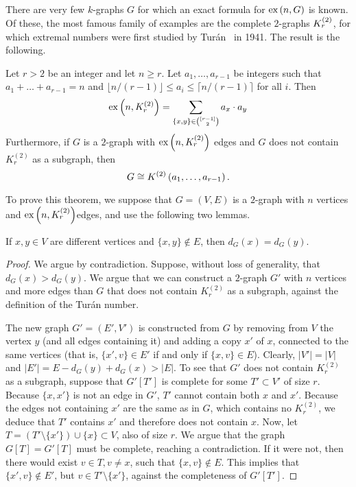 There are very few $k$-graphs $G$ for which an exact formula for $\text{ex} \left( n, G \right)$ is known.
Of these, the most famous family of examples are the complete $2$-graphs $K^{(2)}_{r}$,
for which extremal numbers were first studied by Turán~\cite{Turan1941} in 1941.
The result is the following.

\begin{theorem}
    \label{thm:turan}
    Let $r > 2$ be an integer and let $n \geq r$.
    Let $a_1, \dots, a_{r-1}$ be integers such that $a_1 + \dots + a_{r-1} = n$
    and $\lfloor n / (r-1) \rfloor \leq a_i \leq \lceil n / (r-1) \rceil$ for all $i$.
    Then
    \begin{equation} \label{eq:turan}
        \text{ex} \left( n, K^{(2)}_{r} \right) = \sum_{\{x, y\} \in \binom{[r-1]}{2}} a_x \cdot a_y
    \end{equation}
    Furthermore, if $G$ is a $2$-graph with $\text{ex} \left( n, K^{(2)}_{r} \right)$ edges
    and $G$ does not contain $K_r^{(2)}$ as a subgraph, then
    \[
        G\cong K^{(2)}\left(a_1, \dots, a_{r-1}\right).
    \]

\end{theorem}

To prove this theorem, we suppose that $G = (V, E)$ is a $2$-graph with $n$ vertices and
$\text{ex} \left( n, K^{(2)}_{r} \right)$edges, and use the following two lemmas.

\begin{lemma}\label{lem:same_degree}
    If $x, y \in V$ are different vertices and $\{x, y\} \notin E$, then $d_G(x) = d_G(y)$.
    \begin{proof}
        We argue by contradiction.
        Suppose, without loss of generality, that $d_G(x) > d_G(y)$.
        We argue that we can construct a $2$-graph $G'$ with $n$ vertices
        and more edges than $G$ that does not contain $K_r^{(2)}$ as a subgraph, against the definition of
        the Turán number.

        The new graph $G' = (E', V')$ is constructed from $G$ by removing from $V$ the vertex $y$
        (and all edges containing it)
        and adding a copy $x'$ of $x$, connected to the same vertices (that is, $\{x', v\} \in E'$
        if and only if $\{x, v\} \in E$).
        Clearly, $|V'| = |V|$ and $|E'| = E - d_G(y) + d_G(x) > |E|$.
        To see that $G'$ does not contain $K_r^{(2)}$ as a subgraph,
        suppose that $G'[T']$ is complete for some $T' \subset V'$ of size $r$.
        Because $\{x, x'\}$ is not an edge in $G'$, $T'$ cannot contain both $x$ and $x'$.
        Because the edges not containing $x'$ are the same as in $G$, which contains no $K_r^{(2)}$,
        we deduce that $T'$ contains $x'$ and therefore does not contain $x$.
        Now, let $T = (T' \setminus \{x'\}) \cup \{x\} \subset V$, also of size $r$.
        We argue that the graph $G[T] = G'[T]$ must be complete, reaching a contradiction.
        If it were not, then there would exist $v \in T, v \neq x$, such that $\{x, v\} \notin E$.
        This implies that $\{x', v\} \notin E'$, but $v \in T' \setminus \{x'\}$,
        against the completeness of $G'[T']$.
    \end{proof}
\end{lemma}

